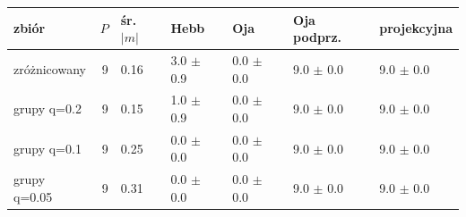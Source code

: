 \begin{tabular}{lrlllll}

\toprule

zbiór & $P$ & śr. $|m|$ & Hebb & Oja & Oja podprz. & projekcyjna \\

\midrule

zróżnicowany & 9 & 0.16 & 3.0 $\pm$ 0.9 & 0.0 $\pm$ 0.0 & 9.0 $\pm$ 0.0 & 9.0 $\pm$ 0.0 \\

grupy q=0.2 & 9 & 0.15 & 1.0 $\pm$ 0.9 & 0.0 $\pm$ 0.0 & 9.0 $\pm$ 0.0 & 9.0 $\pm$ 0.0 \\

grupy q=0.1 & 9 & 0.25 & 0.0 $\pm$ 0.0 & 0.0 $\pm$ 0.0 & 9.0 $\pm$ 0.0 & 9.0 $\pm$ 0.0 \\

grupy q=0.05 & 9 & 0.31 & 0.0 $\pm$ 0.0 & 0.0 $\pm$ 0.0 & 9.0 $\pm$ 0.0 & 9.0 $\pm$ 0.0 \\

\bottomrule

\end{tabular}


